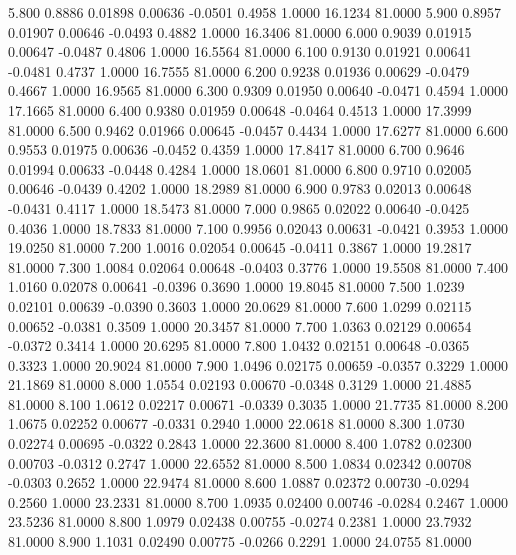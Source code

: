    5.800   0.8886   0.01898   0.00636  -0.0501   0.4958   1.0000  16.1234  81.0000
   5.900   0.8957   0.01907   0.00646  -0.0493   0.4882   1.0000  16.3406  81.0000
   6.000   0.9039   0.01915   0.00647  -0.0487   0.4806   1.0000  16.5564  81.0000
   6.100   0.9130   0.01921   0.00641  -0.0481   0.4737   1.0000  16.7555  81.0000
   6.200   0.9238   0.01936   0.00629  -0.0479   0.4667   1.0000  16.9565  81.0000
   6.300   0.9309   0.01950   0.00640  -0.0471   0.4594   1.0000  17.1665  81.0000
   6.400   0.9380   0.01959   0.00648  -0.0464   0.4513   1.0000  17.3999  81.0000
   6.500   0.9462   0.01966   0.00645  -0.0457   0.4434   1.0000  17.6277  81.0000
   6.600   0.9553   0.01975   0.00636  -0.0452   0.4359   1.0000  17.8417  81.0000
   6.700   0.9646   0.01994   0.00633  -0.0448   0.4284   1.0000  18.0601  81.0000
   6.800   0.9710   0.02005   0.00646  -0.0439   0.4202   1.0000  18.2989  81.0000
   6.900   0.9783   0.02013   0.00648  -0.0431   0.4117   1.0000  18.5473  81.0000
   7.000   0.9865   0.02022   0.00640  -0.0425   0.4036   1.0000  18.7833  81.0000
   7.100   0.9956   0.02043   0.00631  -0.0421   0.3953   1.0000  19.0250  81.0000
   7.200   1.0016   0.02054   0.00645  -0.0411   0.3867   1.0000  19.2817  81.0000
   7.300   1.0084   0.02064   0.00648  -0.0403   0.3776   1.0000  19.5508  81.0000
   7.400   1.0160   0.02078   0.00641  -0.0396   0.3690   1.0000  19.8045  81.0000
   7.500   1.0239   0.02101   0.00639  -0.0390   0.3603   1.0000  20.0629  81.0000
   7.600   1.0299   0.02115   0.00652  -0.0381   0.3509   1.0000  20.3457  81.0000
   7.700   1.0363   0.02129   0.00654  -0.0372   0.3414   1.0000  20.6295  81.0000
   7.800   1.0432   0.02151   0.00648  -0.0365   0.3323   1.0000  20.9024  81.0000
   7.900   1.0496   0.02175   0.00659  -0.0357   0.3229   1.0000  21.1869  81.0000
   8.000   1.0554   0.02193   0.00670  -0.0348   0.3129   1.0000  21.4885  81.0000
   8.100   1.0612   0.02217   0.00671  -0.0339   0.3035   1.0000  21.7735  81.0000
   8.200   1.0675   0.02252   0.00677  -0.0331   0.2940   1.0000  22.0618  81.0000
   8.300   1.0730   0.02274   0.00695  -0.0322   0.2843   1.0000  22.3600  81.0000
   8.400   1.0782   0.02300   0.00703  -0.0312   0.2747   1.0000  22.6552  81.0000
   8.500   1.0834   0.02342   0.00708  -0.0303   0.2652   1.0000  22.9474  81.0000
   8.600   1.0887   0.02372   0.00730  -0.0294   0.2560   1.0000  23.2331  81.0000
   8.700   1.0935   0.02400   0.00746  -0.0284   0.2467   1.0000  23.5236  81.0000
   8.800   1.0979   0.02438   0.00755  -0.0274   0.2381   1.0000  23.7932  81.0000
   8.900   1.1031   0.02490   0.00775  -0.0266   0.2291   1.0000  24.0755  81.0000
